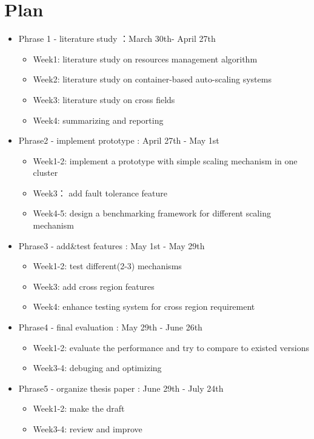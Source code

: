 \documentclass[sigchi]{acmart}
\begin{document}
\section{Plan}
\begin{itemize}
  \item Phrase 1 - literature study ：March 30th- April 27th
  \begin{itemize}
    \item Week1: literature study on resources management algorithm 
    \item Week2: literature study on container-based auto-scaling systems
    \item Week3: literature study on cross fields
    \item Week4: summarizing and reporting
  \end{itemize}
  \item Phrase2 - implement prototype : April 27th - May 1st
  \begin{itemize}
    \item Week1-2: implement a prototype with simple scaling mechanism in one cluster
    \item Week3： add fault tolerance feature
    \item Week4-5: design a benchmarking framework for different scaling mechanism 
  \end{itemize}
  \item Phrase3 - add\&test features : May 1st - May 29th
  \begin{itemize}
    \item Week1-2: test different(2-3) mechanisms
    \item Week3: add cross region features
    \item Week4: enhance testing system for cross region requirement
  \end{itemize}
  \item Phrase4 - final evaluation : May 29th - June 26th
  \begin{itemize}
    \item Week1-2: evaluate the performance and try to compare to existed versions
    \item Week3-4: debuging and optimizing
  \end{itemize}
  \item Phrase5 - organize thesis paper : June 29th - July 24th
  \begin{itemize}
    \item Week1-2: make the draft
    \item Week3-4: review and improve
  \end{itemize}
\end{itemize}
\newpage  


\end{document}
